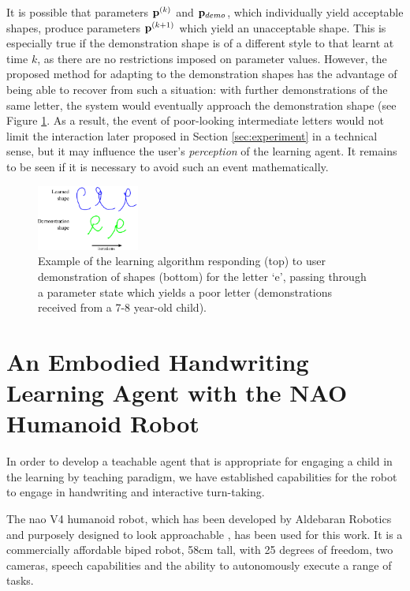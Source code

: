 \documentclass{sig-alternate}
\begin{document}
It is possible that parameters ${\bf p}^{(k)}$ and ${\bf p}_{demo}$, which
individually yield acceptable shapes, produce parameters ${\bf p}^{(k+1)}$
which yield an unacceptable shape. This is especially true if the demonstration
shape is of a different style to that learnt at time $k$, as there are no
restrictions imposed on parameter values. However, the proposed method for adapting to
the demonstration shapes has the advantage of being able to recover from such a situation: with further
demonstrations of the same letter, the system would eventually approach the
demonstration shape (see Figure \ref{fig:eDemo}. As a result, the event of poor-looking 
intermediate letters
would not limit the interaction later proposed in Section \ref{sec:experiment}
in a technical sense, but it may influence the user's \emph{perception} of the learning
agent. It remains to be seen if it is necessary to avoid such an event
mathematically.

\begin{figure}[thpb]
    \centering
    \includegraphics[width=0.3\textwidth]{figures/learningEdemo}
    \caption{\label{fig:eDemo}Example of the learning algorithm
    responding (top) to user demonstration of shapes (bottom) for the letter `e', passing through a parameter state which yields a poor letter (demonstrations received from a 7-8 year-old child).}
\end{figure}



\section{An Embodied Handwriting Learning Agent with the NAO Humanoid Robot}
\label{sec:robotWriting}

In order to develop a teachable agent that is appropriate for engaging a child
in the learning by teaching paradigm, we have established capabilities for the robot 
to engage in handwriting and interactive turn-taking.

The {\sc nao} V4 humanoid robot, which has been developed by Aldebaran Robotics and 
purposely designed to look approachable \cite{Gouaillier2008}, has been used for
this work. It is a commercially affordable biped robot, 58cm tall, with 25
degrees of freedom, two cameras, speech capabilities and the ability to
autonomously execute a range of tasks.
\end{document}
